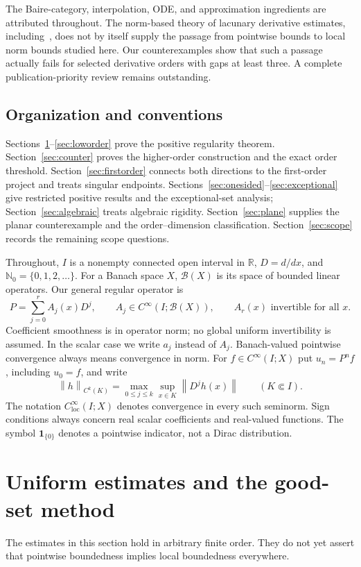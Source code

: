 \documentclass[11pt,reqno]{amsart}
\numberwithin{equation}{section}
\theoremstyle{definition}
\theoremstyle{remark}
\newcommand{\R}{\mathbb R}
\newcommand{\N}{\mathbb N_0}
\newcommand{\B}{\mathcal B}
\newcommand{\loc}{\mathrm{loc}}
\newcommand{\norm}[1]{\left\lVert #1\right\rVert}
\newcommand{\clim}{C^\infty_{\loc}}
\newcommand{\ind}{\mathbf 1}
\begin{document}
The Baire-category, interpolation, ODE, and approximation ingredients are attributed throughout. The norm-based theory of lacunary derivative estimates, including~\cite{rainer-schindl}, does not by itself supply the passage from pointwise bounds to local norm bounds studied here. Our counterexamples show that such a passage actually fails for selected derivative orders with gaps at least three. A complete publication-priority review remains outstanding.

\subsection{Organization and conventions}
Sections~\ref{sec:prelim}--\ref{sec:loworder} prove the positive regularity theorem. Section~\ref{sec:counter} proves the higher-order construction and the exact order threshold. Section~\ref{sec:firstorder} connects both directions to the first-order project and treats singular endpoints. Sections~\ref{sec:onesided}--\ref{sec:exceptional} give restricted positive results and the exceptional-set analysis; Section~\ref{sec:algebraic} treats algebraic rigidity. Section~\ref{sec:plane} supplies the planar counterexample and the order--dimension classification. Section~\ref{sec:scope} records the remaining scope questions.

Throughout, $I$ is a nonempty connected open interval in $\R$, $D=d/dx$, and $\N=\{0,1,2,\ldots\}$. For a Banach space $X$, $\B(X)$ is its space of bounded linear operators. Our general regular operator is
\begin{equation}\label{eq:regular}
 P=\sum_{j=0}^r A_j(x)D^j,\qquad
 A_j\in C^\infty(I;\B(X)),\qquad A_r(x)\text{ invertible for all }x.
\end{equation}
Coefficient smoothness is in operator norm; no global uniform invertibility is assumed. In the scalar case we write $a_j$ instead of $A_j$. Banach-valued pointwise convergence always means convergence in norm. For $f\in C^\infty(I;X)$ put $u_n=P^nf$, including $u_0=f$, and write
\[
 \norm{h}_{C^k(K)}=\max_{0\le j\le k}\sup_{x\in K}\norm{D^jh(x)}
 \qquad(K\Subset I).
\]
The notation $\clim(I;X)$ denotes convergence in every such seminorm. Sign conditions always concern real scalar coefficients and real-valued functions. The symbol $\ind_{\{0\}}$ denotes a pointwise indicator, not a Dirac distribution.

\section{Uniform estimates and the good-set method}\label{sec:prelim}
The estimates in this section hold in arbitrary finite order. They do not yet assert that pointwise boundedness implies local boundedness everywhere.
\end{document}
